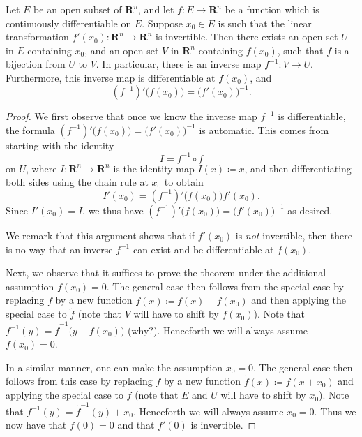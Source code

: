 \begin{theorem}\label{6.7.2}
    Let \(E\) be an open subset of \(\mathbf{R}^n\), and let \(f : E \to \mathbf{R}^n\) be a function which is continuously differentiable on \(E\).
    Suppose \(x_0 \in E\) is such that the linear transformation \(f'(x_0) : \mathbf{R}^n \to \mathbf{R}^n\) is invertible.
    Then there exists an open set \(U\) in \(E\) containing \(x_0\), and an open set \(V\) in \(\mathbf{R}^n\) containing \(f(x_0)\), such that \(f\) is a bijection from \(U\) to \(V\).
    In particular, there is an inverse map \(f^{-1} : V \to U\).
    Furthermore, this inverse map is differentiable at \(f(x_0)\), and
    \[
        (f^{-1})' \big(f(x_0)\big) = \big(f'(x_0)\big)^{-1}.
    \]
\end{theorem}

\begin{proof}
    We first observe that once we know the inverse map \(f^{-1}\) is differentiable, the formula \((f^{-1})' \big(f(x_0)\big) = \big(f'(x_0)\big)^{-1}\) is automatic.
    This comes from starting with the identity
    \[
        I = f^{-1} \circ f
    \]
    on \(U\), where \(I : \mathbf{R}^n \to \mathbf{R}^n\) is the identity map \(I(x) \coloneqq x\), and then differentiating both sides using the chain rule at \(x_0\) to obtain
    \[
        I'(x_0) = (f^{-1})' \big(f(x_0)\big) f'(x_0).
    \]
    Since \(I'(x_0) = I\), we thus have \((f^{-1})' \big(f(x_0)\big) = \big(f'(x_0)\big)^{-1}\) as desired.

    We remark that this argument shows that if \(f'(x_0)\) is \emph{not} invertible, then there is no way that an inverse \(f^{-1}\) can exist and be differentiable at \(f(x_0)\).

    Next, we observe that it suffices to prove the theorem under the additional assumption \(f(x_0) = 0\).
    The general case then follows from the special case by replacing \(f\) by a new function \(\tilde{f}(x) \coloneqq f(x) - f(x_0)\) and then applying the special case to \(\tilde{f}\)
    (note that \(V\) will have to shift by \(f(x_0)\)).
    Note that \(f^{-1}(y) = \tilde{f}^{-1} \big(y - f(x_0)\big)\) (why?).
    Henceforth we will always assume \(f(x_0) = 0\).

    In a similar manner, one can make the assumption \(x_0 = 0\).
    The general case then follows from this case by replacing \(f\) by a new function
    \(\tilde{f}(x) \coloneqq f(x + x_0)\) and applying the special case to \(\tilde{f}\)
    (note that \(E\) and \(U\) will have to shift by \(x_0\)).
    Note that \(f^{-1}(y) = \tilde{f}^{-1} (y) + x_0\).
    Henceforth we will always assume \(x_0 = 0\).
    Thus we now have that \(f(0) = 0\) and that \(f'(0)\) is invertible.


\end{proof}
